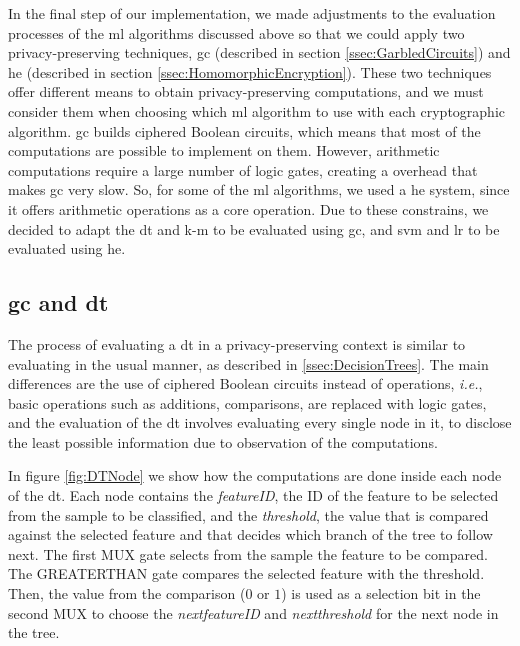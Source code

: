 In the final step of our implementation, we made adjustments to the evaluation processes of the \ac{ml} algorithms discussed above so that we could apply two privacy-preserving techniques, \ac{gc} (described in section \ref{ssec:GarbledCircuits}) and \ac{he} (described in section \ref{ssec:HomomorphicEncryption}).
These two techniques offer different means to obtain privacy-preserving computations, and we must consider them when choosing which \ac{ml} algorithm to use with each cryptographic algorithm. \ac{gc} builds ciphered Boolean circuits, which means that most of the computations are possible to implement on them. However, arithmetic computations require a large number of logic gates, creating a overhead that makes \ac{gc} very slow. So, for some of the \ac{ml} algorithms, we used a \ac{he} system, since it offers arithmetic operations as a core operation. Due to these constrains, we decided to adapt the \ac{dt} and \ac{k-m} to be evaluated using \ac{gc}, and \ac{svm} and \ac{lr} to be evaluated using \ac{he}.


\subsection{\acl{gc} and \acl{dt}}
\label{ssec:GCandDT}

The process of evaluating a \ac{dt} in a privacy-preserving context is similar to evaluating in the usual manner, as described in \ref{ssec:DecisionTrees}. The main differences are the use of ciphered Boolean circuits instead of operations, \textit{i.e.}, basic operations such as additions, comparisons, are replaced with logic gates, and the evaluation of the \ac{dt} involves evaluating every single node in it, to disclose the least possible information due to observation of the computations.

In figure \ref{fig:DTNode} we show how the computations are done inside each node of the \ac{dt}. Each node contains the \textit{featureID}, the ID of the feature to be selected from the sample to be classified, and the \textit{threshold}, the value that is compared against the selected feature and that decides which branch of the tree to follow next. The first MUX gate selects from the sample the feature to be compared. The GREATERTHAN gate compares the selected feature with the threshold. Then, the value from the comparison ($0$ or $1$) is used as a selection bit in the second MUX to choose the \textit{next\textunderscore featureID} and \textit{next\textunderscore threshold} for the next node in the tree. 


